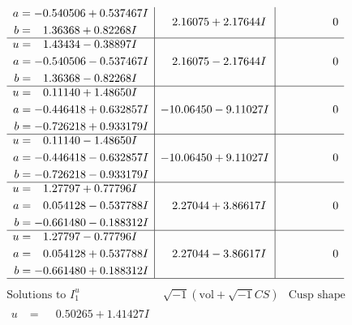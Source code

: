 \documentclass[1p]{elsarticle_modified}
\theoremstyle{definition}
\newcommand{\I}{\sqrt{-1}}
\begin{document}
$$\begin{array}{c|c|c}
\begin{aligned}
a &= -0.540506 + 0.537467 I \\
b &= \phantom{-}1.36368 + 0.82268 I\end{aligned}
 & \phantom{-}2.16075 + 2.17644 I & \phantom{-0.000000 } 0 \\ \hline\begin{aligned}
u &= \phantom{-}1.43434 - 0.38897 I \\
a &= -0.540506 - 0.537467 I \\
b &= \phantom{-}1.36368 - 0.82268 I\end{aligned}
 & \phantom{-}2.16075 - 2.17644 I & \phantom{-0.000000 } 0 \\ \hline\begin{aligned}
u &= \phantom{-}0.11140 + 1.48650 I \\
a &= -0.446418 + 0.632857 I \\
b &= -0.726218 + 0.933179 I\end{aligned}
 & -10.06450 - 9.11027 I & \phantom{-0.000000 } 0 \\ \hline\begin{aligned}
u &= \phantom{-}0.11140 - 1.48650 I \\
a &= -0.446418 - 0.632857 I \\
b &= -0.726218 - 0.933179 I\end{aligned}
 & -10.06450 + 9.11027 I & \phantom{-0.000000 } 0 \\ \hline\begin{aligned}
u &= \phantom{-}1.27797 + 0.77796 I \\
a &= \phantom{-}0.054128 - 0.537788 I \\
b &= -0.661480 - 0.188312 I\end{aligned}
 & \phantom{-}2.27044 + 3.86617 I & \phantom{-0.000000 } 0 \\ \hline\begin{aligned}
u &= \phantom{-}1.27797 - 0.77796 I \\
a &= \phantom{-}0.054128 + 0.537788 I \\
b &= -0.661480 + 0.188312 I\end{aligned}
 & \phantom{-}2.27044 - 3.86617 I & \phantom{-0.000000 } 0\\
 \hline 
 \end{array}$$\newpage$$\begin{array}{c|c|c}  
\text{Solutions to }I^u_{1}& \I (\text{vol} + \sqrt{-1}CS) & \text{Cusp shape}\\
 \hline 
\begin{aligned}
u &= \phantom{-}0.50265 + 1.41427 I \\

\end{aligned}
\end{array}$$
\end{document}
